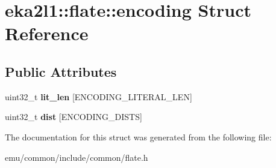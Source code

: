 \hypertarget{structeka2l1_1_1flate_1_1encoding}{}\section{eka2l1\+:\+:flate\+:\+:encoding Struct Reference}
\label{structeka2l1_1_1flate_1_1encoding}
\subsection*{Public Attributes}
\begin{DoxyCompactItemize}
\item 
\mbox{\label{structeka2l1_1_1flate_1_1encoding_a640e9f3bd8951fe057719e122007915d}} 
uint32\+\_\+t {\bfseries lit\+\_\+len} \mbox{[}E\+N\+C\+O\+D\+I\+N\+G\+\_\+\+L\+I\+T\+E\+R\+A\+L\+\_\+\+L\+EN\mbox{]}
\item 
\mbox{\label{structeka2l1_1_1flate_1_1encoding_a0cd4f729bd33849315e1c8778c0f4420}} 
uint32\+\_\+t {\bfseries dist} \mbox{[}E\+N\+C\+O\+D\+I\+N\+G\+\_\+\+D\+I\+S\+TS\mbox{]}
\end{DoxyCompactItemize}


The documentation for this struct was generated from the following file\+:\begin{DoxyCompactItemize}
\item 
emu/common/include/common/flate.\+h\end{DoxyCompactItemize}
